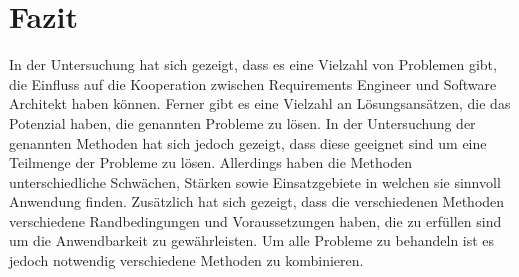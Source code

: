 \section{Fazit}
In der Untersuchung hat sich gezeigt, dass es eine Vielzahl von Problemen gibt, die Einfluss auf die Kooperation zwischen Requirements Engineer und Software Architekt haben können. Ferner gibt es eine Vielzahl an Lösungsansätzen, die das Potenzial haben, die genannten Probleme zu lösen. In der Untersuchung der genannten Methoden hat sich jedoch gezeigt, dass diese geeignet sind um eine Teilmenge der Probleme zu lösen. Allerdings haben die Methoden unterschiedliche Schwächen, Stärken sowie Einsatzgebiete in welchen sie sinnvoll Anwendung finden. Zusätzlich hat sich gezeigt, dass die verschiedenen Methoden verschiedene Randbedingungen und Voraussetzungen haben, die zu erfüllen sind um die Anwendbarkeit zu gewährleisten. Um alle Probleme zu behandeln ist es jedoch notwendig verschiedene Methoden zu kombinieren. \\
